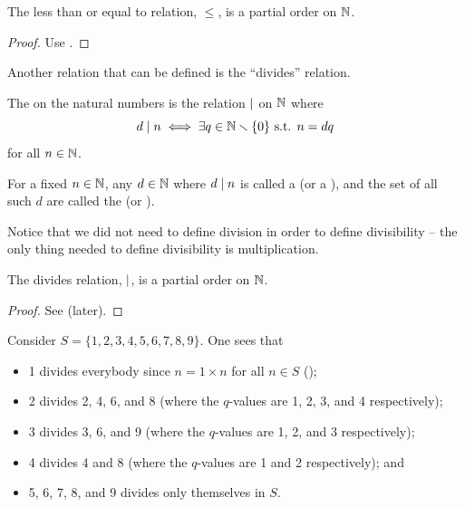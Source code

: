 \begin{proposition}\label{prop:leq-is-partial-order}
    The less than or equal to relation, $\leq$, is a partial order on $\mathbb{N}$.
\end{proposition}
\begin{proof}
    Use .
\end{proof}

Another relation that can be defined is the ``divides'' relation.

\begin{definition}
    The  on the natural numbers is the relation $\mathrel{|}$ on $\mathbb{N}$ where
    \[
        d \mathrel{|} n \iff \exists q \in \mathbb{N} \smallsetminus \{0\} \text{ s.t. } n = dq
    \]
    for all $n \in \mathbb{N}$.

    For a fixed $n \in \mathbb{N}$, any $d \in \mathbb{N}$ where $d \mathrel{|} n$ is called a  (or a ), and the set of all such $d$ are called the  (or ).
\end{definition}

Notice that we did not need to define division in order to define divisibility -- the only thing needed to define divisibility is multiplication.

\begin{proposition}\label{prop:divides-is-partial-order}
    The divides relation, $\mathrel{|}$, is a partial order on $\mathbb{N}$.
\end{proposition}
\begin{proof}
    See  (later).
\end{proof}

\begin{example}\label{example:divides-on-a-subset-of-N}
    Consider $S = \{1, 2, 3, 4, 5, 6, 7, 8, 9\}$. One sees that
    \begin{itemize}
        \item 1 divides everybody since $n = 1 \times n$ for all $n \in S$ ();
        \item 2 divides 2, 4, 6, and 8 (where the $q$-values are 1, 2, 3, and 4 respectively);
        \item 3 divides 3, 6, and 9 (where the $q$-values are 1, 2, and 3 respectively);
        \item 4 divides 4 and 8 (where the $q$-values are 1 and 2 respectively); and
        \item 5, 6, 7, 8, and 9 divides only themselves in $S$.
    \end{itemize}
\end{example}

